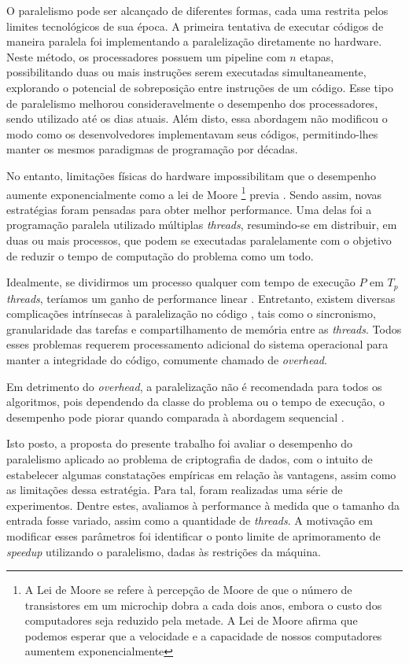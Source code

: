 \documentclass[letterpaper, 10 pt, conference]{ieeeconf}  %
\begin{document}
O paralelismo pode ser alcançado de diferentes formas, cada uma restrita pelos limites tecnológicos de sua época. A primeira tentativa de executar códigos de maneira paralela foi implementando a paralelização diretamente no hardware. Neste método, os processadores possuem um pipeline com $n$ etapas, possibilitando duas ou mais instruções serem executadas simultaneamente, explorando o potencial de sobreposição entre instruções de um código. Esse tipo de paralelismo melhorou consideravelmente o desempenho dos processadores, sendo utilizado até os dias atuais. Além disto, essa abordagem não modificou o modo como os desenvolvedores implementavam seus códigos, permitindo-lhes manter os mesmos paradigmas de programação por décadas.

No entanto, limitações físicas do hardware impossibilitam que o desempenho aumente exponencialmente como a lei de Moore \footnote{A Lei de Moore se refere à percepção de Moore de que o número de transistores em um microchip dobra a cada dois anos, embora o custo dos computadores seja reduzido pela metade. A Lei de Moore afirma que podemos esperar que a velocidade e a capacidade de nossos computadores aumentem exponencialmente} previa \cite{c6}. Sendo assim, novas estratégias foram pensadas para obter melhor performance. Uma delas foi a programação paralela utilizado múltiplas \textit{threads}, resumindo-se em distribuir, em duas ou mais processos, que podem se executadas paralelamente com o objetivo de reduzir o tempo de computação do problema como um todo.

Idealmente, se dividirmos um processo qualquer com tempo de execução $P$ em $T_{p}$ \textit{threads}, teríamos um ganho de performance linear \cite{c5}. Entretanto, existem diversas complicações intrínsecas à paralelização no código \cite{c2}, tais como o sincronismo, granularidade das tarefas e compartilhamento de memória entre as \textit{threads}. Todos esses problemas requerem processamento adicional do sistema operacional para manter a integridade do código, comumente chamado de \textit{overhead}.

Em detrimento do \textit{overhead}, a paralelização não é recomendada para todos os algoritmos, pois dependendo da classe do problema ou o tempo de execução, o desempenho pode piorar quando comparada à abordagem sequencial \cite{c5}. 

Isto posto, a proposta do presente trabalho foi avaliar o desempenho do paralelismo aplicado ao problema de criptografia de dados, com o intuito de estabelecer algumas constatações empíricas em relação às vantagens, assim como as limitações dessa estratégia. Para tal, foram realizadas uma série de experimentos. Dentre estes, avaliamos à performance à medida que o tamanho da entrada fosse variado, assim como a quantidade de \textit{threads}. A motivação em modificar esses parâmetros foi identificar o ponto limite de aprimoramento de \textit{speedup} utilizando o paralelismo, dadas às restrições da máquina.
\end{document}
